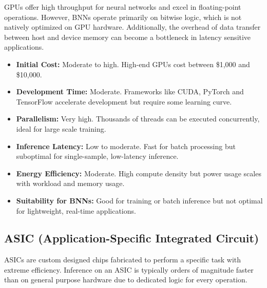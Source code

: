 \documentclass[a4paper,12pt]{report}
\begin{document}
GPUs offer high throughput for neural networks and excel in floating-point operations. However, BNNs operate primarily on bitwise logic, which is not natively optimized on GPU hardware. Additionally, the overhead of data transfer between host and device memory can become a bottleneck in latency sensitive applications.
\begin{itemize}
    \item \textbf{Initial Cost:} Moderate to high. High-end GPUs cost between \$1,000 and \$10,000.
    \item \textbf{Development Time:} Moderate. Frameworks like CUDA, PyTorch and TensorFlow accelerate development but require some learning curve.
    \item \textbf{Parallelism:} Very high. Thousands of threads can be executed concurrently, ideal for large scale training.
    \item \textbf{Inference Latency:} Low to moderate. Fast for batch processing but suboptimal for single-sample, low-latency inference.
    \item \textbf{Energy Efficiency:} Moderate. High compute density but power usage scales with workload and memory usage.
    \item \textbf{Suitability for BNNs:} Good for training or batch inference but not optimal for lightweight, real-time applications.
\end{itemize}

\subsection{ASIC (Application-Specific Integrated Circuit)}
ASICs are custom designed chips fabricated to perform a specific task with extreme efficiency. Inference on an ASIC is typically orders of magnitude faster than on general purpose hardware due to dedicated logic for every operation.
\end{document}
